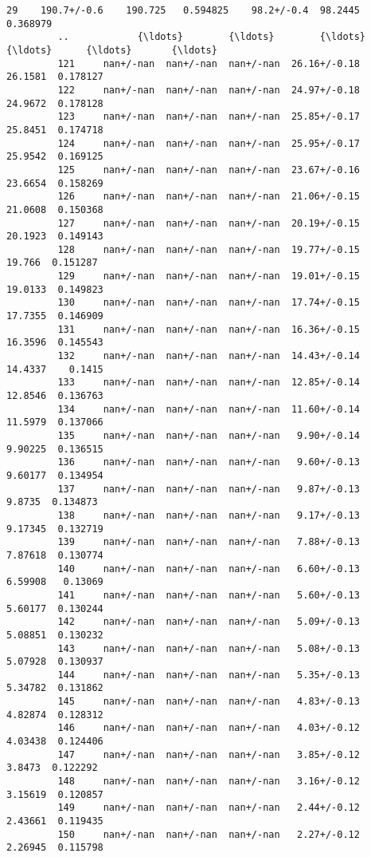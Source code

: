 \documentclass[11pt]{article}
\begin{document}
\begin{Verbatim}[commandchars=\\\{\}]
         29    190.7+/-0.6    190.725   0.594825    98.2+/-0.4  98.2445  0.368979   
         ..            {\ldots}        {\ldots}        {\ldots}           {\ldots}      {\ldots}       {\ldots}   
         121     nan+/-nan  nan+/-nan  nan+/-nan  26.16+/-0.18  26.1581  0.178127   
         122     nan+/-nan  nan+/-nan  nan+/-nan  24.97+/-0.18  24.9672  0.178128   
         123     nan+/-nan  nan+/-nan  nan+/-nan  25.85+/-0.17  25.8451  0.174718   
         124     nan+/-nan  nan+/-nan  nan+/-nan  25.95+/-0.17  25.9542  0.169125   
         125     nan+/-nan  nan+/-nan  nan+/-nan  23.67+/-0.16  23.6654  0.158269   
         126     nan+/-nan  nan+/-nan  nan+/-nan  21.06+/-0.15  21.0608  0.150368   
         127     nan+/-nan  nan+/-nan  nan+/-nan  20.19+/-0.15  20.1923  0.149143   
         128     nan+/-nan  nan+/-nan  nan+/-nan  19.77+/-0.15   19.766  0.151287   
         129     nan+/-nan  nan+/-nan  nan+/-nan  19.01+/-0.15  19.0133  0.149823   
         130     nan+/-nan  nan+/-nan  nan+/-nan  17.74+/-0.15  17.7355  0.146909   
         131     nan+/-nan  nan+/-nan  nan+/-nan  16.36+/-0.15  16.3596  0.145543   
         132     nan+/-nan  nan+/-nan  nan+/-nan  14.43+/-0.14  14.4337    0.1415   
         133     nan+/-nan  nan+/-nan  nan+/-nan  12.85+/-0.14  12.8546  0.136763   
         134     nan+/-nan  nan+/-nan  nan+/-nan  11.60+/-0.14  11.5979  0.137066   
         135     nan+/-nan  nan+/-nan  nan+/-nan   9.90+/-0.14  9.90225  0.136515   
         136     nan+/-nan  nan+/-nan  nan+/-nan   9.60+/-0.13  9.60177  0.134954   
         137     nan+/-nan  nan+/-nan  nan+/-nan   9.87+/-0.13   9.8735  0.134873   
         138     nan+/-nan  nan+/-nan  nan+/-nan   9.17+/-0.13  9.17345  0.132719   
         139     nan+/-nan  nan+/-nan  nan+/-nan   7.88+/-0.13  7.87618  0.130774   
         140     nan+/-nan  nan+/-nan  nan+/-nan   6.60+/-0.13  6.59908   0.13069   
         141     nan+/-nan  nan+/-nan  nan+/-nan   5.60+/-0.13  5.60177  0.130244   
         142     nan+/-nan  nan+/-nan  nan+/-nan   5.09+/-0.13  5.08851  0.130232   
         143     nan+/-nan  nan+/-nan  nan+/-nan   5.08+/-0.13  5.07928  0.130937   
         144     nan+/-nan  nan+/-nan  nan+/-nan   5.35+/-0.13  5.34782  0.131862   
         145     nan+/-nan  nan+/-nan  nan+/-nan   4.83+/-0.13  4.82874  0.128312   
         146     nan+/-nan  nan+/-nan  nan+/-nan   4.03+/-0.12  4.03438  0.124406   
         147     nan+/-nan  nan+/-nan  nan+/-nan   3.85+/-0.12   3.8473  0.122292   
         148     nan+/-nan  nan+/-nan  nan+/-nan   3.16+/-0.12  3.15619  0.120857   
         149     nan+/-nan  nan+/-nan  nan+/-nan   2.44+/-0.12  2.43661  0.119435   
         150     nan+/-nan  nan+/-nan  nan+/-nan   2.27+/-0.12  2.26945  0.115798   
         

\end{Verbatim}
\end{document}
